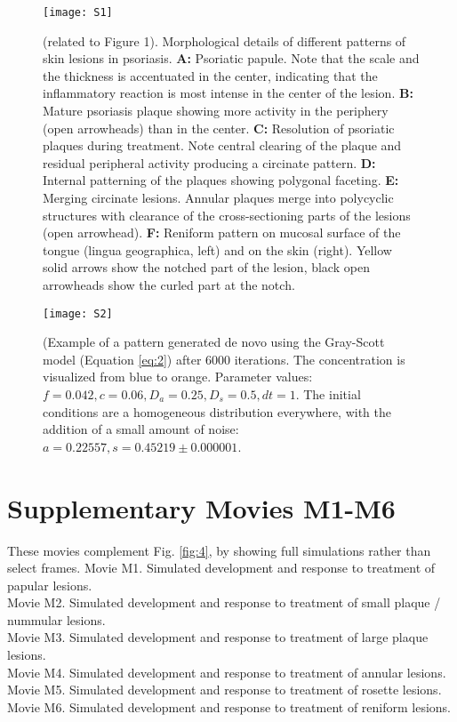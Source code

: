 \begin{figure}[!htb]
  \texttt{[image: S1]}
  \caption{(related to Figure 1). Morphological details of different patterns of skin lesions in psoriasis. \textbf{A:} Psoriatic papule. Note that the scale and the thickness is accentuated in the center, indicating that the inflammatory reaction is most intense in the center of the lesion. \textbf{B:} Mature psoriasis plaque showing more activity in the periphery (open arrowheads) than in the center. \textbf{C:} Resolution of psoriatic plaques during treatment. Note central clearing of the plaque and residual peripheral activity producing a circinate pattern. \textbf{D:} Internal patterning of the plaques showing polygonal faceting. \textbf{E:} Merging circinate lesions. Annular plaques merge into polycyclic structures with clearance of the cross-sectioning parts of the lesions (open arrowhead). \textbf{F:} Reniform pattern on mucosal surface of the tongue (lingua geographica, left) and on the skin (right). Yellow solid arrows show the notched part of the lesion, black open arrowheads show the curled part at the notch.}
  \label{fig:S1}
\end{figure}

\begin{figure}[!htb]
  \centering
  \texttt{[image: S2]}
  \caption{(Example of a pattern generated de novo using the Gray-Scott model (Equation \ref{eq:2}) after 6000 iterations. The concentration is visualized from blue to orange. Parameter values: $f=0.042, c=0.06, D_a=0.25, D_s=0.5, dt=1$. The initial conditions are a homogeneous distribution everywhere, with the addition of a small amount of noise: $a=0.22557, s=0.45219±0.000001$.}
  \label{fig:S2}
\end{figure}

\section{Supplementary Movies M1-M6}
These movies complement Fig. \ref{fig:4}, by showing full simulations rather than select frames.
Movie M1. Simulated development and response to treatment of papular lesions. \\
Movie M2. Simulated development and response to treatment of small plaque / nummular lesions. \\
Movie M3. Simulated development and response to treatment of large plaque lesions. \\
Movie M4. Simulated development and response to treatment of annular lesions. \\
Movie M5. Simulated development and response to treatment of rosette lesions. \\
Movie M6. Simulated development and response to treatment of reniform lesions.